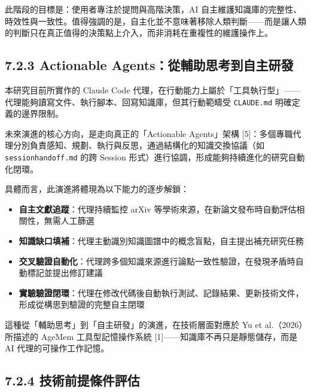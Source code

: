 此階段的目標是：使用者專注於提問與高階決策，AI
自主維護知識庫的完整性、時效性與一致性。值得強調的是，自主化並不意味著移除人類判斷------而是讓人類的判斷只在真正值得的決策點上介入，而非消耗在重複性的維護操作上。

\subsection{7.2.3 Actionable
Agents：從輔助思考到自主研發}\label{actionable-agentsux5f9eux8f14ux52a9ux601dux8003ux5230ux81eaux4e3bux7814ux767c}

本研究目前所實作的 Claude Code
代理，在行動能力上屬於「工具執行型」------代理能夠讀寫文件、執行腳本、回寫知識庫，但其行動範疇受
\texttt{CLAUDE.md} 明確定義的邊界限制。

未來演進的核心方向，是走向真正的「Actionable Agents」架構
{[}5{]}：多個專職代理分別負責感知、規劃、執行與反思，通過結構化的知識交換協議（如
\texttt{sessionhandoff.md} 的跨 Session
形式）進行協調，形成能夠持續進化的研究自動化閉環。

具體而言，此演進將體現為以下能力的逐步解鎖：

\begin{itemize}
\tightlist
\item
  \textbf{自主文獻追蹤}：代理持續監控 arXiv
  等學術來源，在新論文發布時自動評估相關性，無需人工篩選
\item
  \textbf{知識缺口填補}：代理主動識別知識圖譜中的概念盲點，自主提出補充研究任務
\item
  \textbf{交叉驗證自動化}：代理跨多個知識來源進行論點一致性驗證，在發現矛盾時自動標記並提出修訂建議
\item
  \textbf{實驗驗證閉環}：代理在修改代碼後自動執行測試、記錄結果、更新技術文件，形成從構思到驗證的完整自主閉環
\end{itemize}

這種從「輔助思考」到「自主研發」的演進，在技術層面對應於 Yu et
al.（2026）所描述的 AgeMem 工具型記憶操作系統
{[}1{]}------知識庫不再只是靜態儲存，而是 AI 代理的可操作工作記憶。

\subsection{7.2.4
技術前提條件評估}\label{ux6280ux8853ux524dux63d0ux689dux4ef6ux8a55ux4f30}

